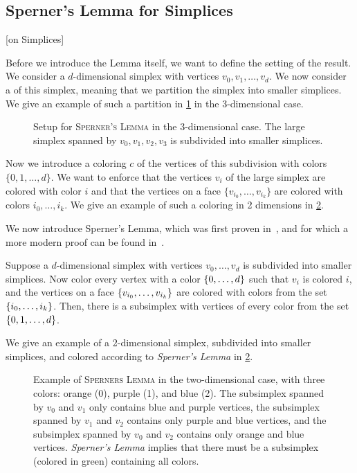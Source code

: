 \subsection{Sperner's Lemma for Simplices}[on Simplices]

Before we introduce the Lemma itself, we want to define the setting of the result. We consider a $d$-dimensional simplex with vertices $v_0, v_1, \dots, v_d$. We now consider a  of this simplex, meaning that we partition the simplex into smaller simplices. We give an example of such a partition in \cref{fig:sperner_setup_example} in the 3-dimensional case.

\begin{figure}[ht]
	\centering
	\caption[Setup for \textsc{Sperner's Lemma}]{Setup for \textsc{Sperner's Lemma} in the 3-dimensional case. The large simplex spanned by $v_0, v_1, v_2, v_3$ is subdivided into smaller simplices.}\label{fig:sperner_setup_example}
\end{figure}

Now we introduce a coloring $c$ of the vertices of this subdivision with colors $\{0, 1, \dots, d\}$. We want to enforce that the vertices $v_i$ of the large simplex are colored with color $i$ and that the vertices on a face $\{v_{i_0}, \dots, v_{i_k}\}$ are colored with colors $i_0, \dots, i_k$. We give an example of such a coloring in 2 dimensions in \cref{fig:sperner_lemma_example}.

We now introduce Sperner's Lemma, which was first proven in~, and for which a more modern proof can be found in~.
\begin{theorem}
	Suppose a $d$-dimensional simplex with vertices $v_0, \dots, v_d$ is subdivided into smaller simplices. Now color every vertex with a color $\left\{0, \dots, d\right\}$ such that $v_i$ is colored $i$, and the vertices on a face $\left\{v_{i_0}, \dots, v_{i_k}\right\}$ are colored with colors from the set $\left\{i_0, \dots, i_k\right\}$. Then, there is a subsimplex with vertices of every color from the set $\left\{0, 1, \dots, d\right\}$.
\end{theorem}

We give an example of a 2-dimensional simplex, subdivided into smaller simplices, and colored according to \textit{Sperner's Lemma} in \cref{fig:sperner_lemma_example}.

\begin{figure}[ht]
	\centering
	\caption[Example of \textsc{Sperners Lemma}]{Example of \textsc{Sperners Lemma} in the two-dimensional case, with three colors: orange (0), purple (1), and blue (2). The subsimplex spanned by $v_0$ and $v_1$ only contains blue and purple vertices, the subsimplex spanned by $v_1$ and $v_2$ contains only purple and blue vertices, and the subsimplex spanned by $v_0$ and $v_2$ contains only orange and blue vertices. \textit{Sperner's Lemma} implies that there must be a subsimplex (colored in green) containing all colors.}\label{fig:sperner_lemma_example}
\end{figure}

